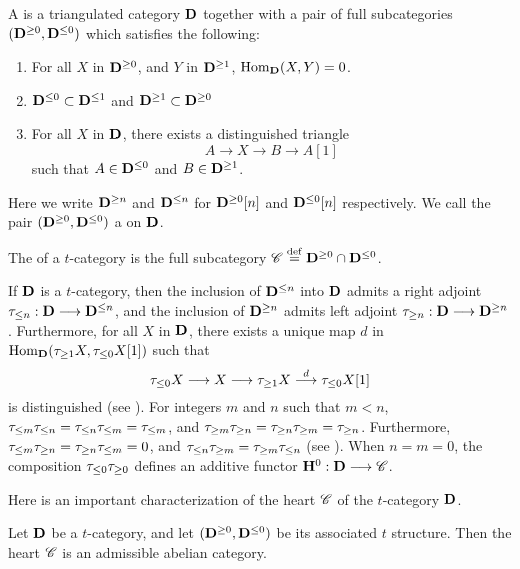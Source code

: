 \begin{defn}\label{def_t_struct}
A  is a triangulated category $\mathbf{D}$ together
with a pair of full subcategories $(\mathbf{D}^{\geq 0}, 
\mathbf{D}^{\leq 0})$ which satisfies the following:
\begin{enumerate}
\item For all $X$ in $\mathbf{D}^{\geq 0}$, and $Y$ in $\mathbf{D}^{\geq 1}$, 
$\mathrm{Hom}_{\mathbf{D}}(X, Y) = 0$.

\item $\mathbf{D}^{\leq 0} \subset \mathbf{D}^{\leq 1}$ and
$\mathbf{D}^{\geq 1} \subset \mathbf{D}^{\geq 0}$

\item For all $X$ in $\mathbf{D}$, there exists a distinguished 
triangle
\[
A \to X \to B \to A[1]
\]
such that $A \in \mathbf{D}^{\leq 0}$ and $B \in \mathbf{D}^{\geq 1}$.
\end{enumerate}
\noindent Here we write $\mathbf{D}^{\geq n}$ and $\mathbf{D}^{\leq n}$ for 
$\mathbf{D}^{\geq 0}[n]$ and $\mathbf{D}^{\leq 0}[n]$ respectively. We call
the pair $(\mathbf{D}^{\geq 0}, \mathbf{D}^{\leq 0})$ a  
on $\mathbf{D}$.

The  of a $t$-category is the full subcategory
$\mathscr{C} \stackrel{\mathrm{def}}{=} \mathbf{D}^{\geq 0} \cap \mathbf{D}^{\leq 0}$.
\end{defn}

If $\mathbf{D}$ is a $t$-category, then the inclusion of $\mathbf{D}^{\leq 
n}$ into $\mathbf{D}$ admits a right adjoint $\tau_{\leq n}: \mathbf{D} \longrightarrow 
\mathbf{D}^{\leq n}$, and the inclusion of $\mathbf{D}^{\geq n}$ admits left 
adjoint $\tau_{\geq n}: \mathbf{D} \longrightarrow \mathbf{D}^{\geq n}$. Furthermore, for 
all $X$ in $\mathbf{D}$, there exists a unique map $d$ in 
$\mathrm{Hom}_{\mathbf{D}}(\tau_{\geq 1}X, \tau_{\leq 0}X[1])$ such that
\[
\tau_{\leq 0} X \longrightarrow X \longrightarrow \tau_{\geq 1} X \stackrel{d}{\longrightarrow} \tau_{\leq 0}X[1]
\]
is distinguished (see \cite[1.3.3]{BBD}). For integers $m$ and $n$ 
such that $m < n$, $\tau_{\leq m} \tau_{\leq n} = 
\tau_{\leq n}\tau_{\leq m} = \tau_{\leq m}$, and $\tau_{\geq m} 
\tau_{\geq n} = \tau_{\geq n} \tau_{\geq m} = \tau_{\geq n}$. Furthermore, 
$\tau_{\leq m} \tau_{\geq n} = \tau_{\geq n} \tau_{\leq m} = 0$, and
$\tau_{\leq n} \tau_{\geq m} = \tau_{\geq m} \tau_{\leq n}$ 
(see \cite[1.3.5]{BBD}). When $n = m = 0$, the composition
$\tau_{\leq 0} \tau_{\geq 0}$ defines an additive functor 
$\mathbf{H}^0 : \mathbf{D} \longrightarrow \mathscr{C}$.

Here is an important characterization of the heart
$\mathscr{C}$ of the $t$-category $\mathbf{D}$.

\begin{thm}\label{thm_heart_is_abel_cat}
Let $\mathbf{D}$ be a $t$-category, and let $(\mathbf{D}^{\geq 0}, 
\mathbf{D}^{\leq 0})$ be its associated $t$ structure. Then the heart 
$\mathscr{C}$ is an admissible abelian category. 
\end{thm}

